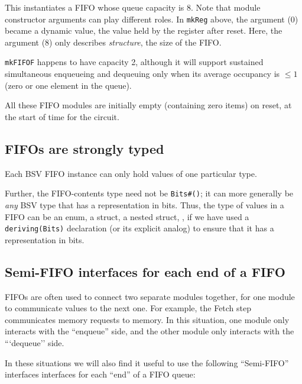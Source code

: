 This instantiates a FIFO whose queue capacity is 8.  Note that module
constructor arguments can play different roles.  In \verb|mkReg|
above, the argument (0) became a dynamic value, the value held by the
register after reset.  Here, the argument (8) only describes
\emph{structure}, {\ie} the size of the FIFO.

{\tt mkFIFOF} happens to have capacity 2, although it will support
sustained simultaneous enqueueing and dequeuing only when its average
occupancy is $\leq 1$ (zero or one element in the queue).

All these FIFO modules are initially empty (containing zero items) on
reset, {\ie} at the start of time for the circuit.


\subsection{FIFOs are strongly typed}


Each BSV FIFO instance can only hold values of one particular type.

Further, the FIFO-contents type need not be \verb|Bits#()|; it can
more generally be \emph{any} BSV type that has a representation in
bits.  Thus, the type of values in a FIFO can be an enum, a struct, a
nested struct, {\etc}, if we have used a \verb|deriving(Bits)|
declaration (or its explicit analog) to ensure that it has a
representation in bits.


\subsection{Semi-FIFO interfaces for each end of a FIFO}

FIFOs are often used to connect two separate modules together, for one
module to communicate values to the next one.  For example, the Fetch
step communicates memory requests to memory.  In this situation, one
module only interacts with the ``enqueue'' side, and the other module
only interacts with the ```dequeue'' side.

In these situations we will also find it useful to use the following
``Semi-FIFO'' interfaces interfaces for each ``end'' of a FIFO queue:


